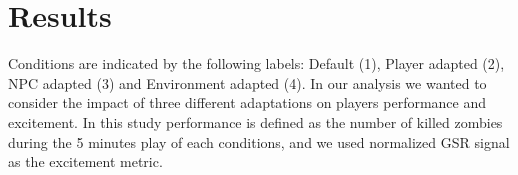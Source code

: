 \documentclass[conference]{IEEEtran}
\begin{document}


\section{Results}
\label{sec:res}


Conditions are indicated by the following labels: Default (1), Player adapted (2), NPC adapted (3) and Environment adapted (4). In our analysis we wanted to consider the impact of three different adaptations on players performance and excitement. In this study performance is defined as the number of killed zombies during the 5 minutes play of each conditions, and we used normalized GSR signal as the excitement metric.
\end{document}
